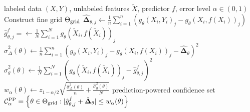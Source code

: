 \documentclass[10pt]{article}
\newcommand{\tX}{\widetilde{X}}
\newcommand{\Xa}{X}
\newcommand{\Xt}{\widetilde{X}}
\newcommand{\Ya}{Y}
\newcommand{\rechat}{\hat{\mathbf{\Delta}}}
\newcommand{\CPP}{\mathcal{C}^{\mathrm{PP}}}
\begin{document}
\vspace{-.4cm}

\begin{algorithm}[H]
\caption{Prediction-powered convex estimation}
\label{alg:general-convex}
\begin{algorithmic}[1]
\Require labeled data $(\Xa, \Ya)$, unlabeled features $\Xt$, predictor $f$, error level $\alpha\in(0,1)$
\State Construct fine grid $\Theta_{\rm grid}$
\State $\rechat_{\theta, j} \leftarrow \frac{1}{n}\sum_{i=1}^n (g_\theta(X_i,Y_i)_j - g_\theta(X_i,f(X_i))_j)$ 
\State $\hat{g}_{\theta, j}^f =\gets \frac{1}{N}\sum_{i=1}^N g_\theta(\tX_i,f(\tX_i))_j$ 
\State $\hat{\sigma}_\Delta^2(\theta)  \leftarrow \frac{1}{n}\sum_{i=1}^n\left(g_\theta(X_i,Y_i)_j - g_\theta(X_i,f(X_i))_j - \rechat_{\theta}\right)^2$ 
\State $\hat{\sigma}_{g}^2(\theta) \gets \frac{1}{N}\sum_{i=1}^N\left(g_\theta(\tX_i,f(\tX_i))_j - \hat g_{\theta, j}^f \right)^2$ 
\State $w_\alpha(
\theta) \leftarrow z_{1-\alpha/2}\sqrt{\frac{\hat{\sigma}^2_\Delta(\theta)}{n} + \frac{\hat{\sigma}^2_{g}(\theta)}{N}}$ 
\EndFor
\Ensure 
prediction-powered confidence set $\CPP_\alpha = \left\{ \theta \in \Theta_{\rm grid} :  | \hat g_{\theta, j}^f + \rechat_{\theta} |  \leq w_\alpha(\theta) \right\}$
\end{algorithmic}
\end{algorithm}

\vspace{-.4cm}
\end{document}
